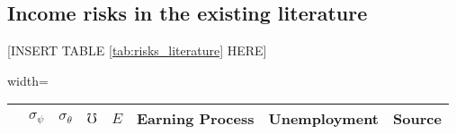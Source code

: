     
\subsection{Income risks in the existing literature}

\begin{center}
[INSERT TABLE \ref{tab:risks_literature} HERE]  
\end{center}

	\begin{sidewaystable}[p]
\centering
\begin{adjustbox}{width={\textwidth}}
\begin{threeparttable}
\caption{The size and nature of idiosyncratic income risks in the literature}
\label{tab:risks_literature}
\begin{tabular}{llllllll}
\hline 

                                 & $\sigma_\psi$  & $\sigma_\theta$ & $\mho$        & $E$          & Earning Process                        & Unemployment & Source    \\
                                 \hline 


\end{tabular}
\end{threeparttable}
\end{adjustbox}
\end{sidewaystable}

